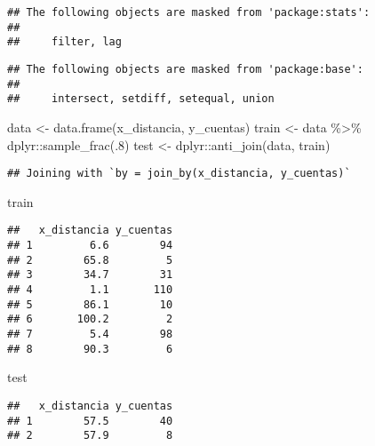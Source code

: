\documentclass[
]{article}
\newenvironment{Shaded}{\begin{snugshade}}{\end{snugshade}}
\newcommand{\DecValTok}[1]{\textcolor[rgb]{0.00,0.00,0.81}{#1}}
\newcommand{\FunctionTok}[1]{\textcolor[rgb]{0.00,0.00,0.00}{#1}}
\newcommand{\NormalTok}[1]{#1}
\newcommand{\OtherTok}[1]{\textcolor[rgb]{0.56,0.35,0.01}{#1}}
\newcommand{\SpecialCharTok}[1]{\textcolor[rgb]{0.00,0.00,0.00}{#1}}
\begin{document}
\begin{verbatim}
## The following objects are masked from 'package:stats':
## 
##     filter, lag
\end{verbatim}

\begin{verbatim}
## The following objects are masked from 'package:base':
## 
##     intersect, setdiff, setequal, union
\end{verbatim}

\begin{Shaded}
\begin{Highlighting}[]
\NormalTok{data }\OtherTok{\textless{}{-}} \FunctionTok{data.frame}\NormalTok{(x\_distancia, y\_cuentas)}
\NormalTok{train }\OtherTok{\textless{}{-}}\NormalTok{ data }\SpecialCharTok{\%\textgreater{}\%}\NormalTok{ dplyr}\SpecialCharTok{::}\FunctionTok{sample\_frac}\NormalTok{(.}\DecValTok{8}\NormalTok{)}
\NormalTok{test }\OtherTok{\textless{}{-}}\NormalTok{ dplyr}\SpecialCharTok{::}\FunctionTok{anti\_join}\NormalTok{(data, train)}
\end{Highlighting}
\end{Shaded}

\begin{verbatim}
## Joining with `by = join_by(x_distancia, y_cuentas)`
\end{verbatim}

\begin{Shaded}
\begin{Highlighting}[]
\NormalTok{train}
\end{Highlighting}
\end{Shaded}

\begin{verbatim}
##   x_distancia y_cuentas
## 1         6.6        94
## 2        65.8         5
## 3        34.7        31
## 4         1.1       110
## 5        86.1        10
## 6       100.2         2
## 7         5.4        98
## 8        90.3         6
\end{verbatim}

\begin{Shaded}
\begin{Highlighting}[]
\NormalTok{test}
\end{Highlighting}
\end{Shaded}

\begin{verbatim}
##   x_distancia y_cuentas
## 1        57.5        40
## 2        57.9         8
\end{verbatim}
\end{document}
